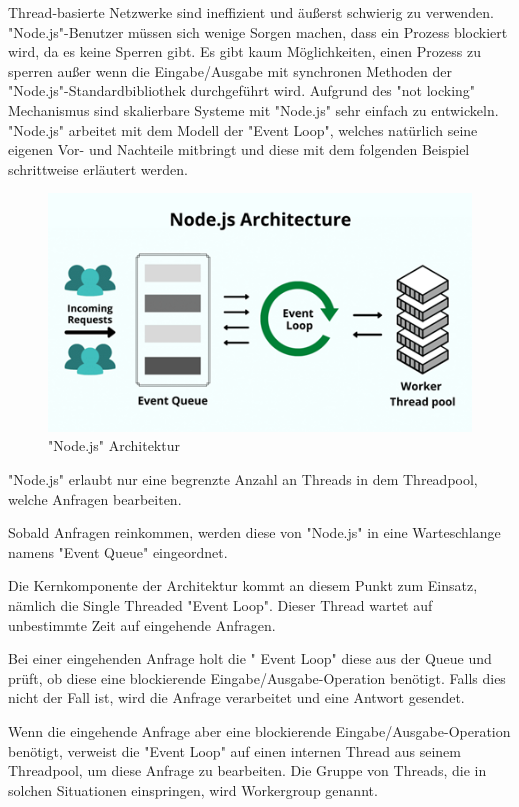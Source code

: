 Thread-basierte Netzwerke sind ineffizient und äußerst schwierig zu verwenden. "Node.js"-Benutzer müssen sich wenige Sorgen machen, dass ein Prozess blockiert wird, da es keine Sperren gibt. Es gibt kaum Möglichkeiten, einen Prozess zu sperren außer wenn die Eingabe/Ausgabe mit synchronen Methoden der "Node.js"-Standardbibliothek durchgeführt wird. Aufgrund des "not locking" Mechanismus sind skalierbare Systeme mit "Node.js" sehr einfach zu entwickeln. 
"Node.js" arbeitet mit dem Modell der "Event Loop", welches natürlich seine eigenen Vor- und Nachteile mitbringt und diese mit dem folgenden Beispiel schrittweise erläutert werden.


\begin{figure}[H]
    \centering
    \includegraphics{media/NodeJs/NodeJsArchitektur.png}
    \caption{"Node.js" Architektur \cite{ArchitekturFoto}}
\end{figure}


"Node.js" erlaubt nur eine begrenzte Anzahl an Threads in dem Threadpool, welche Anfragen bearbeiten. \cite{NodeJsArch} \cite{NodeJsArch2}

Sobald Anfragen reinkommen, werden diese von "Node.js" in eine Warteschlange namens "Event Queue" eingeordnet. \cite{NodeJsArch} \cite{NodeJsArch2}

Die Kernkomponente der Architektur kommt an diesem Punkt zum Einsatz, nämlich die Single Threaded "Event Loop". Dieser Thread wartet auf unbestimmte Zeit auf eingehende Anfragen. \cite{NodeJsArch} \cite{NodeJsArch2}

Bei einer eingehenden Anfrage holt die " Event Loop" diese aus der Queue und prüft, ob diese eine blockierende Eingabe/Ausgabe-Operation benötigt. Falls dies nicht der Fall ist, wird die Anfrage verarbeitet und eine Antwort gesendet. \cite{NodeJsArch} \cite{NodeJsArch2}

Wenn die eingehende Anfrage aber eine blockierende Eingabe/Ausgabe-Operation benötigt, verweist die "Event Loop" auf einen internen Thread aus seinem Threadpool, um diese Anfrage zu bearbeiten. Die Gruppe von Threads, die in solchen Situationen einspringen, wird Workergroup genannt. \cite{NodeJsArch} \cite{NodeJsArch2}

